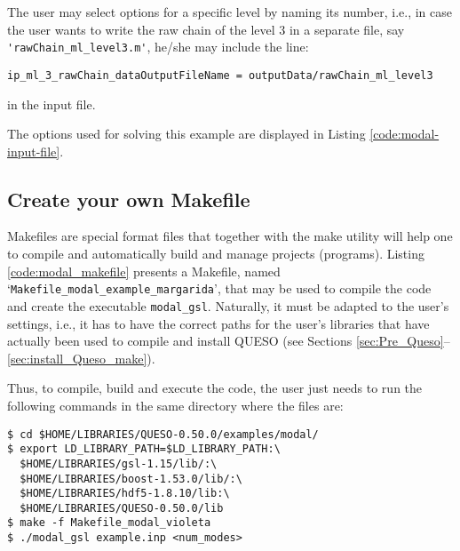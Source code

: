 The user may select options for a specific level by naming its number, i.e., in case the user wants to write the raw chain of the level 3 in a separate file, say \verb+'rawChain_ml_level3.m'+, he/she may include the line: 
\begin{lstlisting}
ip_ml_3_rawChain_dataOutputFileName = outputData/rawChain_ml_level3 
\end{lstlisting}
in the input file.


The options used for solving this example are displayed in Listing \ref{code:modal-input-file}. 





\subsection{Create your own Makefile}\label{sec:modal-makefile}

Makefiles are special format files that together with the make utility will help one to compile and automatically build and manage projects (programs).  
Listing \ref{code:modal_makefile} presents a Makefile, named `\texttt{Makefile\_modal\_example\_margarida}', that may be used to compile the code and create the executable \verb+modal_gsl+. Naturally, it must be adapted to the user's settings, i.e., it has to have the correct paths for the user's libraries that have actually been used to compile and install QUESO  (see Sections \ref{sec:Pre_Queso}--\ref{sec:install_Queso_make}).



Thus, to compile, build and execute the code, the user just needs to run the following commands in the same directory where the files are:
\begin{lstlisting}
$ cd $HOME/LIBRARIES/QUESO-0.50.0/examples/modal/
$ export LD_LIBRARY_PATH=$LD_LIBRARY_PATH:\
  $HOME/LIBRARIES/gsl-1.15/lib/:\
  $HOME/LIBRARIES/boost-1.53.0/lib/:\
  $HOME/LIBRARIES/hdf5-1.8.10/lib:\
  $HOME/LIBRARIES/QUESO-0.50.0/lib 
$ make -f Makefile_modal_violeta 
$ ./modal_gsl example.inp <num_modes>
\end{lstlisting}

